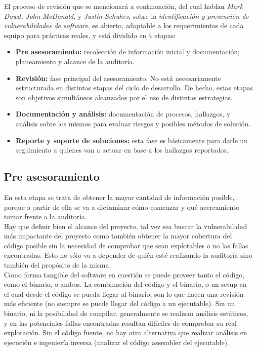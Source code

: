 El proceso de revisión que se mencionará a continuación, del cual hablan \textit{Mark Dowd, John McDonald,} y \textit{Justin Schuhes}, sobre la \textit{identificación y prevención de vulnerabilidades de software}, es abierto, adaptable a los requerimientos de cada equipo para prácticas reales, y está dividido en 4 etapas:
\begin{itemize}
\item \textbf{Pre asesoramiento:} recolección de información inicial y documentación; planeamiento y alcance de la auditoría.
\item \textbf{Revisión:} fase principal del asesoramiento. No está necesariamente estructurada en distintas etapas del ciclo de desarrollo. De hecho, estas etapas son objetivos simultáneos alcanzados por el uso de distintas estrategias. 
\item \textbf{Documentación y análisis:} documentación de procesos, hallazgos, y análisis sobre los mismos para evaluar riesgos y posibles métodos de solución. 
\item \textbf{Reporte y soporte de soluciones:} esta fase es básicamente para darle un seguimiento a quienes van a actuar en base a los hallazgos reportados.
\end{itemize}

\subsection{Pre asesoramiento}
En esta etapa se trata de obtener la mayor cantidad de información posible, porque a partir de ella se va a dictaminar cómo comenzar y qué acercamiento tomar frente a la auditoría.\\

Hay que definir bien el alcance del proyecto, tal vez sea buscar la vulnerabilidad más impactante del proyecto como también obtener la mayor cobertura del código posible sin la necesidad de comprobar que sean explotables o no las fallas encontradas. Esto no sólo va a depender de quién esté realizando la auditoría sino también del propósito de la misma.\\

Como forma tangible del software en cuestión se puede proveer tanto el código, como el binario, o ambos. La combinación del código y el binario, o un setup en el cual desde el código se pueda llegar al binario, son lo que hacen una revisión más eficiente (no siempre se puede llegar del código a un ejecutable). Sin un binario, ni la posibilidad de compilar, generalmente se realizan análisis estáticos, y en las potenciales fallas encontradas resultan difíciles de comprobar su real explotación. Sin el código fuente, no hay otra alternativa que realizar análisis en ejecución e ingeniería inversa (analizar el código assembler del ejecutable).\\

